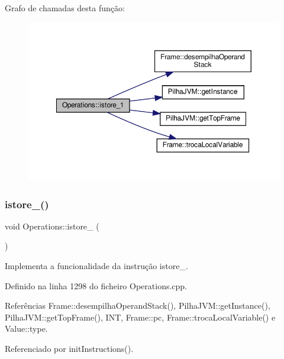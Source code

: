 Grafo de chamadas desta função\+:
\nopagebreak
\begin{figure}[H]
\begin{center}
\leavevmode
\includegraphics[width=350pt]{classOperations_aeb89677195b16d5c595ec9faaddc2c76_cgraph}
\end{center}
\end{figure}
\mbox{\label{classOperations_a0fbc901b4c88aef8455b30d9b2063447}} 
\subsubsection{\texorpdfstring{istore\+\_()}{istore\_2()}}
{\footnotesize\ttfamily void Operations\+::istore\+\_ (\begin{DoxyParamCaption}{ }\end{DoxyParamCaption})\hspace{0.3cm}{\ttfamily [private]}}



Implementa a funcionalidade da instrução istore\+\_. 



Definido na linha 1298 do ficheiro Operations.\+cpp.



Referências Frame\+::desempilha\+Operand\+Stack(), Pilha\+J\+V\+M\+::get\+Instance(), Pilha\+J\+V\+M\+::get\+Top\+Frame(), I\+NT, Frame\+::pc, Frame\+::troca\+Local\+Variable() e Value\+::type.



Referenciado por init\+Instructions().

